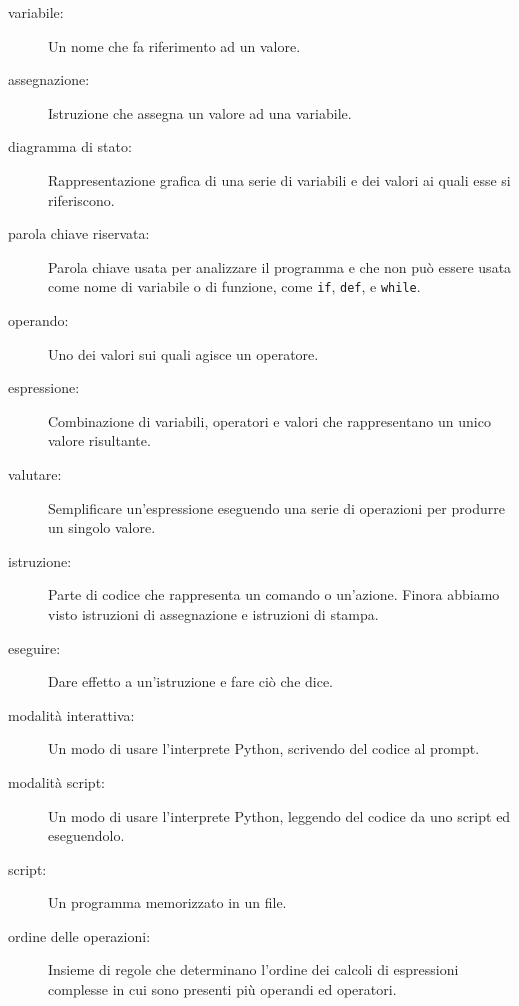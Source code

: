 \documentclass[10pt]{book}
\begin{document}
\begin{description}

\item[variabile:]  Un nome che fa riferimento ad un valore.

\item[assegnazione:]  Istruzione che assegna un valore ad una variabile.

\item[diagramma di stato:]  Rappresentazione grafica di una serie di variabili e dei valori ai quali esse si riferiscono.

\item[parola chiave riservata:]  Parola chiave usata per analizzare il programma e che non può essere usata come nome di variabile o di funzione, come {\tt if}, {\tt  def}, e {\tt while}.

\item[operando:]  Uno dei valori sui quali agisce un operatore.

\item[espressione:]  Combinazione di variabili, operatori e valori che rappresentano un unico valore risultante.

\item[valutare:]  Semplificare un'espressione eseguendo una serie di operazioni per produrre un singolo valore.

\item[istruzione:]  Parte di codice che rappresenta un comando o un'azione.    Finora abbiamo visto istruzioni di assegnazione e istruzioni di stampa.

\item[eseguire:]  Dare effetto a un'istruzione e fare ciò che dice.

\item[modalità interattiva:] Un modo di usare l'interprete Python, scrivendo del codice al prompt.

\item[modalità script:] Un modo di usare l'interprete Python, leggendo del codice da uno script ed eseguendolo.

\item[script:] Un programma memorizzato in un file.

\item[ordine delle operazioni:]  Insieme di regole che determinano l'ordine dei calcoli di espressioni complesse in cui sono presenti più operandi ed operatori.


\end{description}
\end{document}
